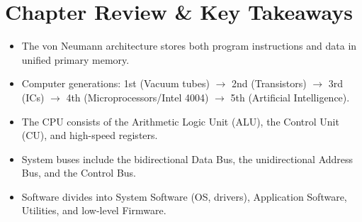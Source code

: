 \section{Chapter Review \& Key Takeaways}
\begin{tcolorbox}[enhanced, colback=boxgreenbg, colframe=boxgreenborder, boxrule=1pt, arc=4pt, title={\bfseries\sffamily Summary Checklist}]
\sffamily\small
\begin{itemize}[leftmargin=1.2em, itemsep=2pt]
    \item The von Neumann architecture stores both program instructions and data in unified primary memory.
    \item Computer generations: 1st (Vacuum tubes) $\rightarrow$ 2nd (Transistors) $\rightarrow$ 3rd (ICs) $\rightarrow$ 4th (Microprocessors/Intel 4004) $\rightarrow$ 5th (Artificial Intelligence).
    \item The CPU consists of the Arithmetic Logic Unit (ALU), the Control Unit (CU), and high-speed registers.
    \item System buses include the bidirectional Data Bus, the unidirectional Address Bus, and the Control Bus.
    \item Software divides into System Software (OS, drivers), Application Software, Utilities, and low-level Firmware.
\end{itemize}
\end{tcolorbox}
